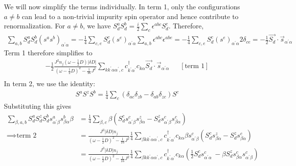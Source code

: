 \documentclass{revtex4-2}
\begin{document}
We will now simplify the terms individually. In term 1, only the configurations \(a \neq b\) can lead to a non-trivial impurity spin operator and hence contribute to renormalization. For \(a \neq b\), we have \(S_d^a S_d^b = \frac{i}{2} \sum_c \epsilon^{abc}S_d^c \). Therefore,
\begin{equation}\begin{aligned}
\sum_{a,b}S_d^a S_d^b\left(s^a s^b\right)_{\alpha^\prime \alpha} = - \frac{1}{4}\sum_{c,e} S_d^c \left(s^e\right)_{\alpha^\prime \alpha}\sum_{a,b}\epsilon^{abc}\epsilon^{abe} = - \frac{1}{4}\sum_{c,e} S_d^c \left(s^e\right)_{\alpha^\prime \alpha} 2 \delta_{ce} = -\frac{1}{2}\vec{S_d}\cdot\vec{s}_{\alpha^\prime \alpha}
\end{aligned}\end{equation}
Term 1 therefore simplifies to
\begin{equation}\begin{aligned}
	-\frac{1}{2}\frac{J^2 n_j \left(\omega - \frac{1}{2}D\right)|\delta D|}{\left(\omega - \frac{1}{2}D\right)^2 - \frac{1}{16}J^2} \sum_{k k^\prime \alpha \alpha^\prime,c} c^\dagger_{k^\prime\alpha^\prime} c_{k\alpha} \vec{S_d}\cdot\vec{s}_{\alpha^\prime \alpha} && \left[\text{term 1}\right]\\
\end{aligned}\end{equation}
In term 2, we use the identity:
\begin{equation}\begin{aligned}
S^a S^z S^b = \frac{1}{4}\sum_c \left(\delta_{ac}\delta_{zb} - \delta_{ab}\delta_{zc}\right) S^c
\end{aligned}\end{equation}
Substituting this gives
\begin{equation}\begin{aligned}
	\sum_{\beta,a,b} S_d^a S_d^z S_d^b s^a_{\alpha^\prime \beta} s^b_{\beta \alpha} \beta &= \frac{1}{4}\sum_{\beta,c}\beta \left(S_d^c s^c_{\alpha^\prime\beta}s^z_{\beta\alpha} - S_d^z s^c_{\alpha^\prime\beta} s^c_{\beta\alpha}\right) \\
	\implies \text{term 2} &= \frac{J^3|\delta D| n_j}{\left(\omega - \frac{1}{2}D\right)^2 - \frac{1}{16}J^2} \frac{1}{4}\sum_{\beta k k^\prime \alpha \alpha^\prime,c} c^\dagger_{k^\prime\alpha^\prime} c_{k\alpha} \beta s^c_{\alpha^\prime\beta}\left(S_d^c s^z_{\beta\alpha} - S_d^z s^c_{\beta\alpha}\right)\\
			       &= \frac{J^3|\delta D| n_j}{\left(\omega - \frac{1}{2}D\right)^2 - \frac{1}{16}J^2} \frac{1}{4}\sum_{\beta k k^\prime \alpha \alpha^\prime,c} c^\dagger_{k^\prime\alpha^\prime} c_{k\alpha} \left(\frac{1}{2}S_d^c s^c_{\alpha^\prime\alpha}\ - \beta S_d^z s^c_{\beta\alpha}s^c_{\alpha^\prime\beta}\right)
\end{aligned}\end{equation}
\end{document}
